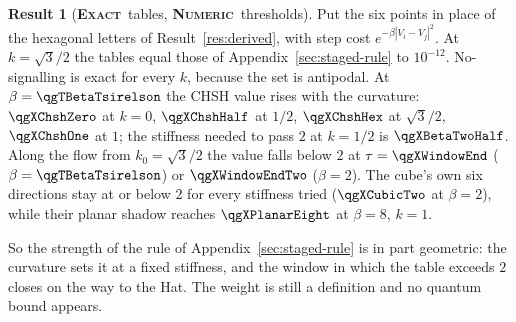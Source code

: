 \documentclass[11pt]{article}
\newcommand{\exact}{\textbf{\textsc{Exact}}}
\newcommand{\numeric}{\textbf{\textsc{Numeric}}}
\theoremstyle{definition}
\newtheorem{result}{Result}
\begin{document}
\begin{result}[\exact\ tables, \numeric\ thresholds]\label{res:shadow}
Put the six points in place of the hexagonal letters of Result~\ref{res:derived}, with step cost $e^{-\beta|V_i-V_j|^2}$. At $k=\sqrt3/2$ the tables equal those of Appendix~\ref{sec:staged-rule} to $10^{-12}$. No-signalling is exact for every $k$, because the set is antipodal. At $\beta=\qgTBetaTsirelson$ the CHSH value rises with the curvature: $\qgXChshZero$ at $k=0$, $\qgXChshHalf$ at $1/2$, $\qgXChshHex$ at $\sqrt3/2$, $\qgXChshOne$ at $1$; the stiffness needed to pass $2$ at $k=1/2$ is $\qgXBetaTwoHalf$. Along the flow from $k_0=\sqrt3/2$ the value falls below $2$ at $\tau=\qgXWindowEnd$ ($\beta=\qgTBetaTsirelson$) or $\qgXWindowEndTwo$ ($\beta=2$). The cube's own six directions stay at or below $2$ for every stiffness tried ($\qgXCubicTwo$ at $\beta=2$), while their planar shadow reaches $\qgXPlanarEight$ at $\beta=8$, $k=1$.
\end{result}
So the strength of the rule of Appendix~\ref{sec:staged-rule} is in part geometric: the curvature sets it at a fixed stiffness, and the window in which the table exceeds $2$ closes on the way to the Hat. The weight is still a definition and no quantum bound appears.
\end{document}
